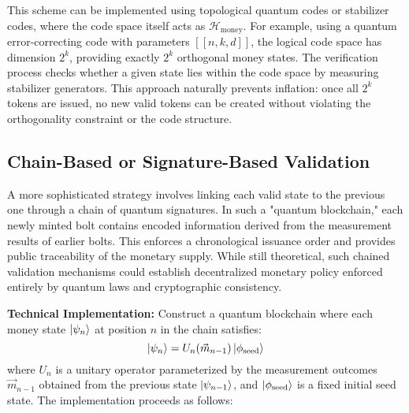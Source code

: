 \documentclass[a4paper,10.5pt,twoside]{article}
\begin{document}
This scheme can be implemented using topological quantum codes or stabilizer codes,\autocite{Gottesman_Chuang_2001} where the code space itself acts as $\mathcal{H}_{\text{money}}$. For example, using a quantum error-correcting code with parameters $[[n,k,d]]$, the logical code space has dimension $2^k$, providing exactly $2^k$ orthogonal money states. The verification process checks whether a given state lies within the code space by measuring stabilizer generators.\autocite{Nielsen_Chuang_2010} This approach naturally prevents inflation: once all $2^k$ tokens are issued, no new valid tokens can be created without violating the orthogonality constraint or the code structure.

\subsection{Chain-Based or Signature-Based Validation}\label{s:3.3}
A more sophisticated strategy involves linking each valid state to the previous one through a chain of quantum signatures.\autocite{Gottesman_Chuang_2001,Ben-David_Sattath_2017} In such a "quantum blockchain," each newly minted bolt contains encoded information derived from the measurement results of earlier bolts. This enforces a chronological issuance order and provides public traceability of the monetary supply. While still theoretical, such chained validation mechanisms could establish decentralized monetary policy enforced entirely by quantum laws and cryptographic consistency.

\textbf{Technical Implementation:} Construct a quantum blockchain where each money state $\ket{\psi_n}$ at position $n$ in the chain satisfies:
\begin{equation}
\ket{\psi_n} = U_n(\vec{m}_{n-1}) \ket{\phi_{\text{seed}}}
\end{equation}
where $U_n$ is a unitary operator parameterized by the measurement outcomes $\vec{m}_{n-1}$ obtained from the previous state $\ket{\psi_{n-1}}$, and $\ket{\phi_{\text{seed}}}$ is a fixed initial seed state. The implementation proceeds as follows:
\end{document}
